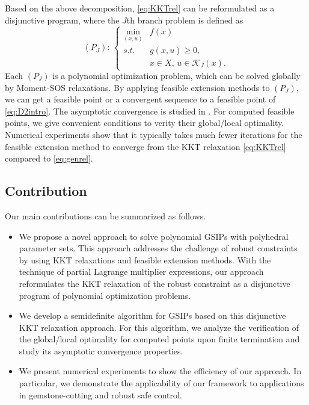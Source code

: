 \documentclass{amsart}
\theoremstyle{plain}
\newcommand{\st}{\mathit{s.t.}}
\newcommand{\mc}[1]{\mathcal{#1}}
\numberwithin{equation}{section}
\begin{document}
	Based on the above decomposition, \eqref{eq:KKTrel} can be reformulated as a 
        disjunctive program, where the $J$th branch problem is defined as
	\[
	(P_J):\, \left\{\begin{array}{cl}
		\min\limits_{(x,u)} & f(x)\\
		\st & g(x,u)\ge 0,\\
		& x\in X,\, u\in \mc{K}_J(x).
	\end{array}
	\right.
	\]
	Each $(P_J)$ is a polynomial optimization problem, 
        which can be solved globally by Moment-SOS relaxations.
        By applying feasible extension methods to $(P_J)$, 
        we can get a feasible point or a convergent sequence to a feasible point of  
        \eqref{eq:D2intro}. The asymptotic convergence is studied in .
        For computed feasible points, we give convenient conditions to verity their 
        global/local optimality. 
	Numerical experiments show that it typically takes much fewer iterations for 
	the feasible extension method to converge from the KKT relaxation \eqref{eq:KKTrel} 
	compared to \eqref{eq:genrel}. 

        \subsection*{Contribution}
	Our main contributions can be summarized as follows.
		\begin{itemize}
			\item 
            We propose a novel approach to solve polynomial GSIPs with 
            polyhedral parameter sets. 
            This approach addresses the challenge of robust constraints by using
            KKT relaxations and feasible extension methods. 
            With the technique of partial Lagrange multiplier expressions, 
            our approach reformulates the KKT relaxation of the robust constraint
            as a disjunctive program of polynomial optimization problems. 
            
                
			
			\item 
            We develop a semidefinite algorithm for GSIPs based on this 
            disjunctive KKT relaxation approach.
            For this algorithm, we analyze the verification of the global/local optimality
            for computed points upon finite termination and 
            study its asymptotic convergence properties. 
			
			\item 
            We present numerical experiments to show the efficiency of our approach.
            In particular, we demonstrate the applicability of our framework to 
            applications in gemstone-cutting and robust safe control. 
	\end{itemize}
	
\end{document}
